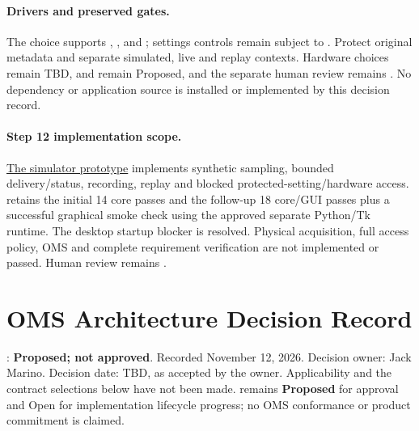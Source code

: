\paragraph{Drivers and preserved gates.}
The choice supports , ,
 and ; settings controls
remain subject to . Protect original metadata and
separate simulated, live and replay contexts. Hardware choices remain TBD,
 and  remain Proposed,
and the separate human review remains \StatusPending. No dependency or
application source is installed or implemented by this decision record.

\paragraph{Step 12 implementation scope.} \hyperref[Section:SimulatorPrototype]{The simulator prototype} implements synthetic sampling, bounded delivery/status, recording, replay and blocked protected-setting/hardware access.  retains the initial 14 core passes and the follow-up 18 core/GUI passes plus a successful graphical smoke check using the approved separate Python/Tk runtime. The desktop startup blocker is resolved. Physical acquisition, full access policy, OMS and complete requirement verification are not implemented or passed. Human review remains \StatusPending.

\section{OMS Architecture Decision Record}
\label{Section:ProposedOMSBoundary}
: \textbf{Proposed; not approved}.
Recorded November 12, 2026. Decision owner: Jack Marino.
Decision date: TBD, as accepted by the owner. Applicability and the contract
selections below have not been made.  remains
\textbf{Proposed} for approval and Open for implementation lifecycle progress;
no OMS conformance or product commitment is claimed.



